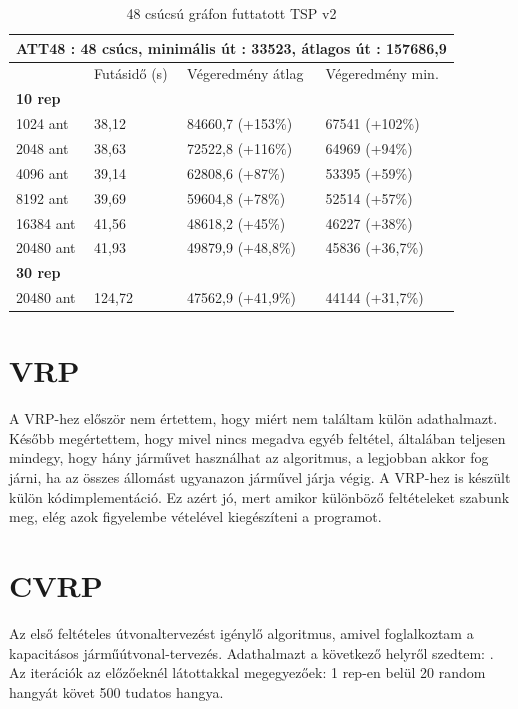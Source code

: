 \begin{table}[htbp!]
	\centering
	\begin{tabular}{|p{2cm}||p{3cm}|p{3.5cm}|p{3.5cm}|}
		\hline
		\multicolumn{4}{|c|}{ATT48 : 48 csúcs, minimális út : 33523, átlagos út : 157686,9} \\
		\hline
		& Futásidő (s) & Végeredmény átlag & Végeredmény min.\\
		\hline
		\textbf{10 rep} & & & \\
		1024 ant & 38,12 & 84660,7 (+153\%) & 67541 (+102\%) \\
		2048 ant & 38,63 & 72522,8 (+116\%) & 64969 (+94\%) \\
		4096 ant & 39,14 & 62808,6 (+87\%) & 53395 (+59\%) \\
		8192 ant & 39,69 & 59604,8 (+78\%) & 52514 (+57\%) \\
		16384 ant & 41,56 & 48618,2 (+45\%) & 46227 (+38\%)\\
		20480 ant & 41,93 & 49879,9 (+48,8\%) & 45836 (+36,7\%)\\
		\hline
		\textbf{30 rep} & & & \\
		20480 ant & 124,72 & 47562,9 (+41,9\%) & 44144 (+31,7\%) \\
		\hline
	\end{tabular}
	\caption{48 csúcsú gráfon futtatott TSP v2}
	\label{table:TSPv2_48}
\end{table}

\newpage

\section{VRP}
A VRP-hez először nem értettem, hogy miért nem találtam külön adathalmazt. Később megértettem, hogy mivel nincs megadva egyéb feltétel, általában teljesen mindegy, hogy hány járművet használhat az algoritmus, a legjobban akkor fog járni, ha az összes állomást ugyanazon járművel járja végig. A VRP-hez is készült külön kódimplementáció. Ez azért jó, mert amikor különböző feltételeket szabunk meg, elég azok figyelembe vételével kiegészíteni a programot.


\section{CVRP}
Az első feltételes útvonaltervezést igénylő algoritmus, amivel foglalkoztam a kapacitásos járműútvonal-tervezés. Adathalmazt a következő helyről szedtem: \cite{CVRPdataset}.
Az iterációk az előzőeknél látottakkal megegyezőek: 1 rep-en belül 20 random hangyát követ 500 tudatos hangya.

